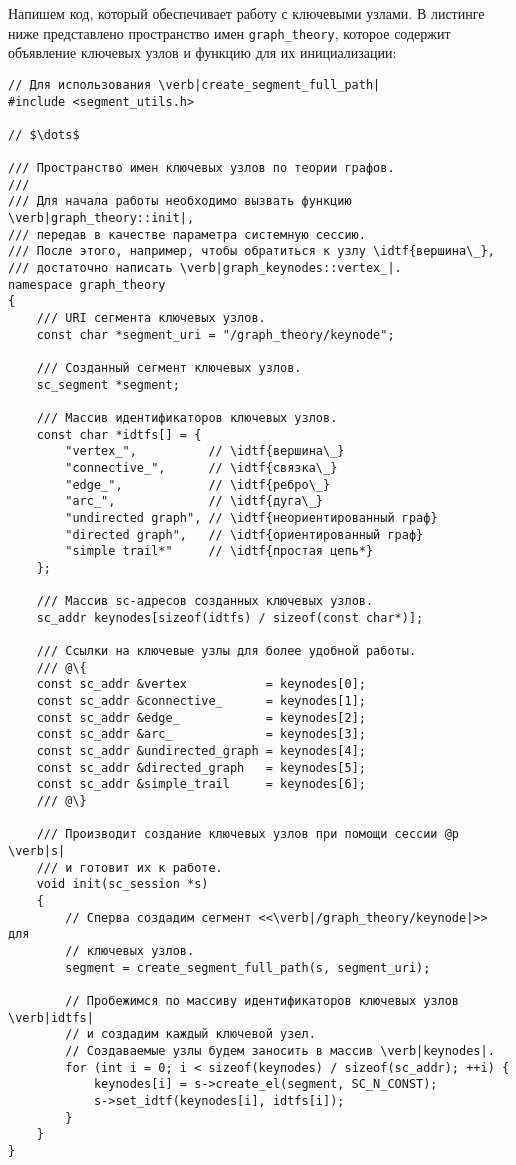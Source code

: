 Напишем код, который обеспечивает работу с ключевыми
узлами. В листинге ниже представлено пространство имен
\lstinline|graph_theory|, которое содержит объявление ключевых узлов и
функцию для их инициализации:
\begin{lstlisting}[texcl]
// Для использования \verb|create_segment_full_path|
#include <segment_utils.h>

// $\dots$

/// Пространство имен ключевых узлов по теории графов.
///
/// Для начала работы необходимо вызвать функцию \verb|graph_theory::init|,
/// передав в качестве параметра системную сессию.
/// После этого, например, чтобы обратиться к узлу \idtf{вершина\_},
/// достаточно написать \verb|graph_keynodes::vertex_|.
namespace graph_theory
{
    /// URI сегмента ключевых узлов.
    const char *segment_uri = "/graph_theory/keynode";

    /// Созданный сегмент ключевых узлов.
    sc_segment *segment;

    /// Массив идентификаторов ключевых узлов.
    const char *idtfs[] = {
        "vertex_",          // \idtf{вершина\_}
        "connective_",      // \idtf{связка\_}
        "edge_",            // \idtf{ребро\_}
        "arc_",             // \idtf{дуга\_}
        "undirected graph", // \idtf{неориентированный граф}
        "directed graph",   // \idtf{ориентированный граф}
        "simple trail*"     // \idtf{простая цепь*}
    };

    /// Массив sc-адресов созданных ключевых узлов.
    sc_addr keynodes[sizeof(idtfs) / sizeof(const char*)];

    /// Ссылки на ключевые узлы для более удобной работы.
    /// @\{
    const sc_addr &vertex           = keynodes[0];
    const sc_addr &connective_      = keynodes[1];
    const sc_addr &edge_            = keynodes[2];
    const sc_addr &arc_             = keynodes[3];
    const sc_addr &undirected_graph = keynodes[4];
    const sc_addr &directed_graph   = keynodes[5];
    const sc_addr &simple_trail     = keynodes[6];
    /// @\}

    /// Производит создание ключевых узлов при помощи сессии @p \verb|s|
    /// и готовит их к работе.
    void init(sc_session *s)
    {
        // Сперва создадим сегмент <<\verb|/graph_theory/keynode|>> для
        // ключевых узлов.
        segment = create_segment_full_path(s, segment_uri);

        // Пробежимся по массиву идентификаторов ключевых узлов \verb|idtfs|
        // и создадим каждый ключевой узел.
        // Создаваемые узлы будем заносить в массив \verb|keynodes|.
        for (int i = 0; i < sizeof(keynodes) / sizeof(sc_addr); ++i) {
            keynodes[i] = s->create_el(segment, SC_N_CONST);
            s->set_idtf(keynodes[i], idtfs[i]);
        }
    }
}
\end{lstlisting}


